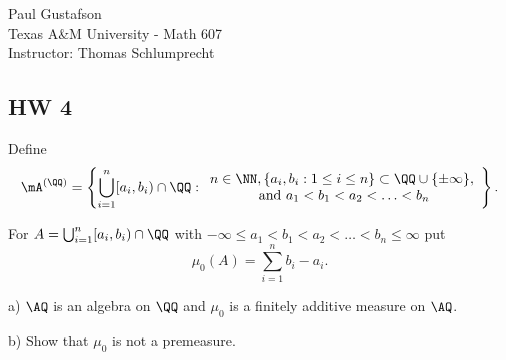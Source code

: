\documentclass{article}
\begin{document}
\noindent Paul Gustafson\\
\noindent Texas A\&M University - Math 607\\ 
\noindent Instructor: Thomas Schlumprecht

\subsection*{HW 4}
 Define 
$$ \mA^{(\QQ)}  = \left\{ \bigcup_{i = 1}^n [a_i, b_i) \cap \QQ : \begin{array}{c} n \in \NN, \{a_i, b_i : 1 \le i \le n\} \subset \QQ \cup \{ \pm \infty\}, 
\\ \text{ and } a_1 < b_1 < a_2 < \ldots < b_n \end{array} \right\}.$$

For $A = \bigcup_{i=1}^n [a_i, b_i) \cap \QQ$ with $-\infty \le a_1 < b_1 < a_2 < \ldots < b_n \le \infty$ put 
$$ \mu_0(A) = \sum_{i=1}^n b_i - a_i.$$

a) $\AQ$ is an algebra on $\QQ$ and $\mu_0$ is a finitely additive measure on $\AQ$.

b) Show that $\mu_0$ is not a premeasure.
\end{document}
